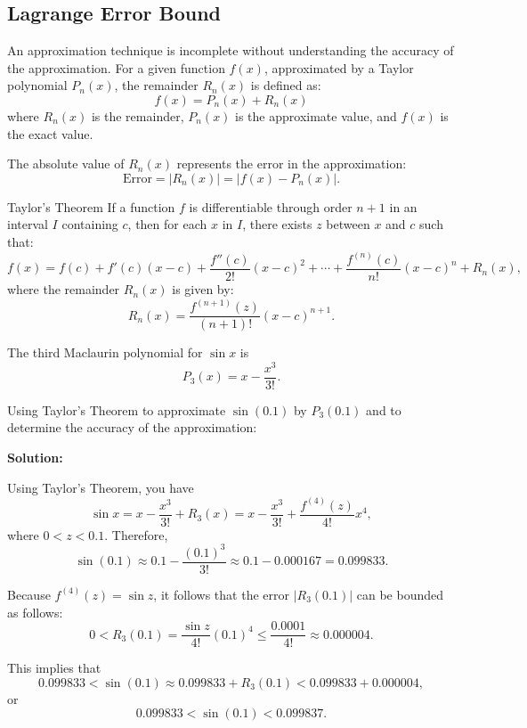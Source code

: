 \documentclass[12pt]{article}
\theoremstyle{beautifulthm}
\begin{document}
\subsection{Lagrange Error Bound}
An approximation technique is incomplete without understanding the accuracy of the approximation. For a given function $f(x)$, approximated by a Taylor polynomial $P_n(x)$, the remainder $R_n(x)$ is defined as:
\[
f(x) = P_n(x) + R_n(x)
\]
where $R_n(x)$ is the remainder, $P_n(x)$ is the approximate value, and $f(x)$ is the exact value. 

The absolute value of $R_n(x)$ represents the error in the approximation:
\[
\text{Error} = |R_n(x)| = |f(x) - P_n(x)|.
\]


\begin{mytheorem}{Taylor's Theorem}{}
 If a function $f$ is differentiable through order $n+1$ in an interval $I$ containing $c$, then for each $x$ in $I$, there exists $z$ between $x$ and $c$ such that:
\[
f(x) = f(c) + f'(c)(x - c) + \frac{f''(c)}{2!}(x - c)^2 + \cdots + \frac{f^{(n)}(c)}{n!}(x - c)^n + R_n(x),
\]
where the remainder $R_n(x)$ is given by:
\[
R_n(x) = \frac{f^{(n+1)}(z)}{(n+1)!}(x - c)^{n+1}.
\]   
\end{mytheorem}


\begin{tcolorbox}[colback=examplebg, colframe=red!75!black, title=\textbf{EXAMPLE 1: Determining the Accuracy of an Approximation}, fonttitle=\bfseries, sharp corners]

The third Maclaurin polynomial for $\sin x$ is 
\[
P_3(x) = x - \frac{x^3}{3!}.
\]

Using Taylor's Theorem to approximate $\sin(0.1)$ by $P_3(0.1)$ and to determine the accuracy of the approximation:

\tcblower
\textbf{Solution:} 

Using Taylor's Theorem, you have
\[
\sin x = x - \frac{x^3}{3!} + R_3(x) = x - \frac{x^3}{3!} + \frac{f^{(4)}(z)}{4!}x^4,
\]
where $0 < z < 0.1$. Therefore,
\[
\sin(0.1) \approx 0.1 - \frac{(0.1)^3}{3!} \approx 0.1 - 0.000167 = 0.099833.
\]

Because $f^{(4)}(z) = \sin z$, it follows that the error $|R_3(0.1)|$ can be bounded as follows:
\[
0 < R_3(0.1) = \frac{\sin z}{4!}(0.1)^4 \leq \frac{0.0001}{4!} \approx 0.000004.
\]

This implies that 
\[
0.099833 < \sin(0.1) \approx 0.099833 + R_3(0.1) < 0.099833 + 0.000004,
\]
or
\[
0.099833 < \sin(0.1) < 0.099837.
\]
\end{tcolorbox}
\end{document}
